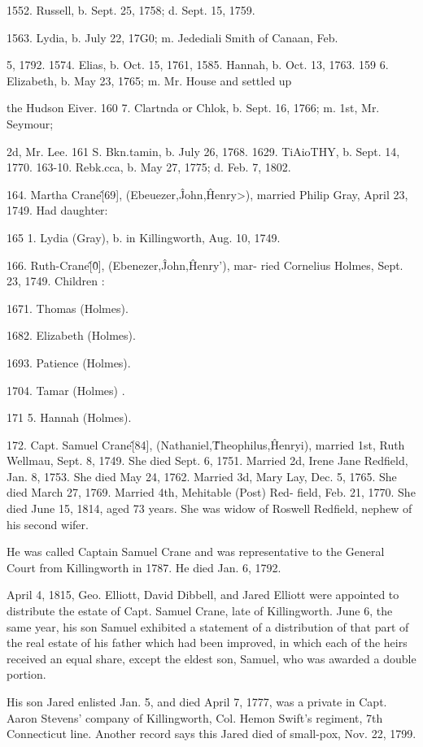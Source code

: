 \documentclass{book}
\begin{document}
1552. Russell, b. Sept. 25, 1758; d. Sept. 15, 1759. 




1563. Lydia, b. July 22, 17G0; m. Jedediali Smith of Canaan, Feb. 

5, 1792. 
1574. Elias, b. Oct. 15, 1761, 
1585. Hannah, b. Oct. 13, 1763. 
159  6. Elizabeth, b. May 23, 1765; m. Mr. House and settled up 

the Hudson Eiver. 
160  7. Clartnda or Chlok, b. Sept. 16, 1766; m. 1st, Mr. Seymour; 

2d, Mr. Lee. 
161 S. Bkn.tamin, b. July 26, 1768. 
1629. TiAioTHY, b. Sept. 14, 1770. 
163-10. Rebk.cca, b. May 27, 1775; d. Feb. 7, 1802. 

164. Martha Crane\^ [69], (Ebeuezer,\^ John,\^ Henry>), 
married Philip Gray, April 23, 1749. Had daughter: 

165  1. Lydia (Gray), b. in Killingworth, Aug. 10, 1749. 

166. Ruth-Crane\^ [\^0], (Ebenezer,\^ John,\^ Henry'), mar- 
ried Cornelius Holmes, Sept. 23, 1749. Children : 

1671. Thomas (Holmes). 

1682. Elizabeth (Holmes). 

1693. Patience (Holmes). 

1704. Tamar (Holmes) . 

171  5. Hannah (Holmes). 

172. Capt. Samuel Crane\^ [84], (Nathaniel,\^ Theophilus,\^ 
Henryi), married 1st, Ruth Wellmau, Sept. 8, 1749. She died 
Sept. 6, 1751. Married 2d, Irene Jane Redfield, Jan. 8, 1753. 
She died May 24, 1762. Married 3d, Mary Lay, Dec. 5, 1765. 
She died March 27, 1769. Married 4th, Mehitable (Post) Red- 
field, Feb. 21, 1770. She died June 15, 1814, aged 73 years. 
She was widow of Roswell Redfield, nephew of his second wifer. 

He was called Captain Samuel Crane and was representative 
to the General Court from Killingworth in 1787. He died Jan. 
6, 1792. 

April 4, 1815, Geo. Elliott, David Dibbell, and Jared Elliott 
were appointed to distribute the estate of Capt. Samuel Crane, 
late of Killingworth. June 6, the same year, his son Samuel 
exhibited a statement of a distribution of that part of the real 
estate of his father which had been improved, in which each of 
the heirs received an equal share, except the eldest son, Samuel, 
who was awarded a double portion. 

His son Jared enlisted Jan. 5, and died April 7, 1777, was a 
private in Capt. Aaron Stevens' company of Killingworth, Col. 
Hemon Swift's regiment, 7th Connecticut line. Another record 
says this Jared died of small-pox, Nov. 22, 1799. 
\end{document}
